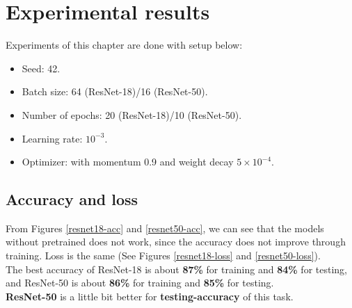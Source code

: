 \chapter{Experimental results}
\indent
	Experiments of this chapter are done with setup below: 
	\begin{itemize}
		\item Seed: 42.
		\item Batch size: 64 (ResNet-18)/16 (ResNet-50).
		\item Number of epochs: 20 (ResNet-18)/10 (ResNet-50).
		\item Learning rate: $10^{-3}$.
		\item Optimizer:  with momentum 0.9 and weight decay $5 \times 10^{-4}$.
	\end{itemize} 

\section{Accuracy and loss}
\indent
	From Figures \ref{resnet18-acc} and \ref{resnet50-acc}, we can see that the models without pretrained does not work, since
	the accuracy does not improve through training. Loss is the same (See Figures \ref{resnet18-loss} and \ref{resnet50-loss}). \\ 
	The best accuracy of ResNet-18 is about \textbf{87\%} for training and \textbf{84\%} for testing, and ResNet-50 is about
	\textbf{86\%} for training and \textbf{85\%} for testing. \\
	\textbf{ResNet-50} is a little bit better for \textbf{testing-accuracy} of this task.

